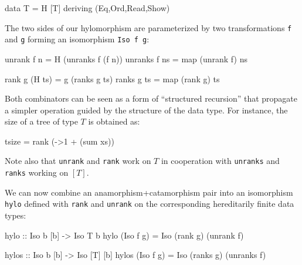 \documentclass[]{INCLUDES/llncs}
\begin{document}
\begin{code}
data T = H [T] deriving (Eq,Ord,Read,Show)
\end{code}
The two sides of our hylomorphism 
are parameterized by two transformations
{\tt f} and {\tt g} forming
an isomorphism {\tt Iso f g}:
\begin{code}
unrank f n = H (unranks f (f n))
unranks f ns = map (unrank f) ns

rank g (H ts) = g (ranks g ts)
ranks g ts = map (rank g) ts
\end{code}
Both combinators can be seen as a form of ``structured recursion''
that propagate a simpler operation guided by the structure of
the data type. For instance, the size of a tree of type $T$ is
obtained as:
\begin{code}
tsize = rank (\xs->1 + (sum xs))
\end{code}
Note also that {\tt unrank} and {\tt rank}
work on $T$ in cooperation
with {\tt unranks} and {\tt ranks} 
working on $[T]$. 

We can now combine an 
anamorphism+catamorphism pair into
an isomorphism {\tt hylo} defined
with {\tt rank} and {\tt unrank} 
on the corresponding
hereditarily finite data types:
\begin{code}
hylo :: Iso b [b] -> Iso T b
hylo (Iso f g) = Iso (rank g) (unrank f)

hylos :: Iso b [b] -> Iso [T] [b]
hylos (Iso f g) = Iso (ranks g) (unranks f)
\end{code}
\end{document}
